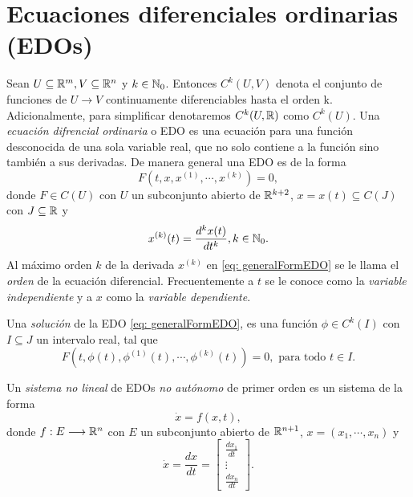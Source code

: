     \section{Ecuaciones diferenciales ordinarias (EDOs)}
    Sean $U \subseteq {\mathbb{R}}^{m}, V \subseteq {\mathbb{R}}^{n}$ y $k\in {\mathbb{N}}_{0}$. Entonces $C^{k}(U, V)$ denota el conjunto de funciones de $U \longrightarrow V$ continuamente diferenciables hasta el orden k. Adicionalmente, para simplificar denotaremos $C^{k}(U, {\mathbb{R}})$ como $C^{k}(U)$. Una \textit{ecuación difrencial ordinaria} o EDO es una ecuación para una función desconocida de una sola variable real, que no solo contiene a la función sino también a sus derivadas. De manera general una EDO es de la forma
    \begin{equation}
    	F(t, x, x^{(1)}, \cdots, x^{(k)}) = 0,
    	\label{eq: generalFormEDO}
    \end{equation}
    donde $F \in C(U)$ con $U$ un subconjunto abierto de ${\mathbb{R}}^{k+2}$, $x = x(t) \subseteq C(J)$ con $J \subseteq {\mathbb{R}}$ y
    \begin{equation*}
    	x^{(k)}(t) = \frac{d^{k}x(t)}{dt^{k}}, k \in {\mathbb{N}}_{0}.
    \end{equation*}
    Al máximo orden $k$ de la derivada $x^{(k)}$ en \eqref{eq: generalFormEDO} se le llama el \textit{orden} de la ecuación diferencial. Frecuentemente a $t$ se le conoce como la \textit{variable independiente} y a $x$ como la \textit{variable dependiente}.
    
    Una \textit{solución} de la EDO \eqref{eq: generalFormEDO}, es una función $\phi \in C^{k}(I)$ con $I \subseteq J$ un intervalo real, tal que
    \begin{equation}
    	F(t, \phi(t), \phi^{(1)}(t), \cdots, \phi^{(k)}(t)) = 0, \text{ para todo } t \in I.
    \end{equation}
    
    Un \textit{sistema no lineal} de EDOs \textit{no autónomo} de primer orden es un sistema de la forma
    \begin{equation}
    	\dot{x} = f(x, t),
    	\label{eq:generalFormSisEDOs}
    \end{equation}
    donde $f:E \longrightarrow {\mathbb{R}}^{n}$ con $E$ un subconjunto abierto de ${\mathbb{R}}^{n+1}$, $x = (x_{1}, \cdots, x_{n})$ y
    \begin{equation*}
    	\dot{x} = \frac{dx}{dt} = 
    	\begin{bmatrix}
    		\frac{dx_{1}}{dt} \\
    		\vdots \\
    		\frac{dx_{n}}{dt}
    	\end{bmatrix}.
    \end{equation*}
    
